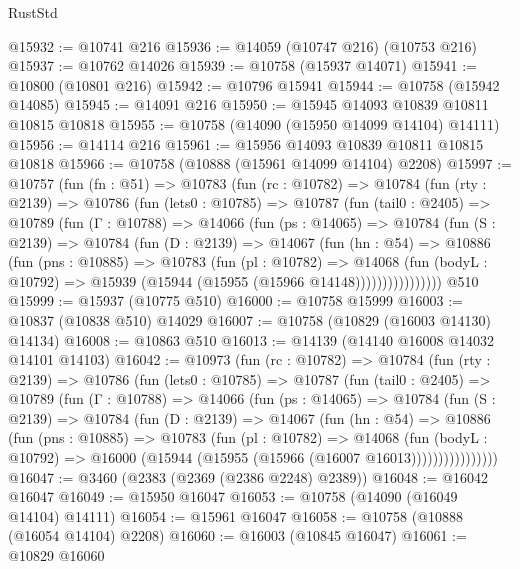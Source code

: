 \begin{lexlean}{RustStd}
\begin{coremodule}
@15932 := @10741 @216
@15936 := @14059 (@10747 @216) (@10753 @216)
@15937 := @10762 @14026
@15939 := @10758 (@15937 @14071)
@15941 := @10800 (@10801 @216)
@15942 := @10796 @15941
@15944 := @10758 (@15942 @14085)
@15945 := @14091 @216
@15950 := @15945 @14093 @10839 @10811 @10815 @10818
@15955 := @10758 (@14090 (@15950 @14099 @14104) @14111)
@15956 := @14114 @216
@15961 := @15956 @14093 @10839 @10811 @10815 @10818
@15966 := @10758 (@10888 (@15961 @14099 @14104) @2208)
@15997 := @10757
    (fun (fn : @51) =>
    @10783
      (fun (rc : @10782) =>
      @10784
        (fun (rty : @2139) =>
        @10786
          (fun (lets0 : @10785) =>
          @10787
            (fun (tail0 : @2405) =>
            @10789
              (fun (Γ : @10788) =>
              @14066
                (fun (ps : @14065) =>
                @10784
                  (fun (S : @2139) =>
                  @10784
                    (fun (D : @2139) =>
                    @14067
                      (fun (hn : @54) =>
                      @10886
                        (fun (pns : @10885) =>
                        @10783
                          (fun (pl : @10782) =>
                          @14068
                            (fun (bodyL : @10792) =>
                            @15939 (@15944 (@15955 (@15966 @14148))))))))))))))))
    @510
@15999 := @15937 (@10775 @510)
@16000 := @10758 @15999
@16003 := @10837 (@10838 @510) @14029
@16007 := @10758 (@10829 (@16003 @14130) @14134)
@16008 := @10863 @510
@16013 := @14139 (@14140 @16008 @14032 @14101 @14103)
@16042 := @10973
    (fun (rc : @10782) =>
    @10784
      (fun (rty : @2139) =>
      @10786
        (fun (lets0 : @10785) =>
        @10787
          (fun (tail0 : @2405) =>
          @10789
            (fun (Γ : @10788) =>
            @14066
              (fun (ps : @14065) =>
              @10784
                (fun (S : @2139) =>
                @10784
                  (fun (D : @2139) =>
                  @14067
                    (fun (hn : @54) =>
                    @10886
                      (fun (pns : @10885) =>
                      @10783
                        (fun (pl : @10782) =>
                        @14068
                          (fun (bodyL : @10792) =>
                          @16000 (@15944 (@15955 (@15966 (@16007 @16013))))))))))))))))
@16047 := @3460 (@2383 (@2369 (@2386 @2248) @2389))
@16048 := @16042 @16047
@16049 := @15950 @16047
@16053 := @10758 (@14090 (@16049 @14104) @14111)
@16054 := @15961 @16047
@16058 := @10758 (@10888 (@16054 @14104) @2208)
@16060 := @16003 (@10845 @16047)
@16061 := @10829 @16060

\end{coremodule}
\end{lexlean}
